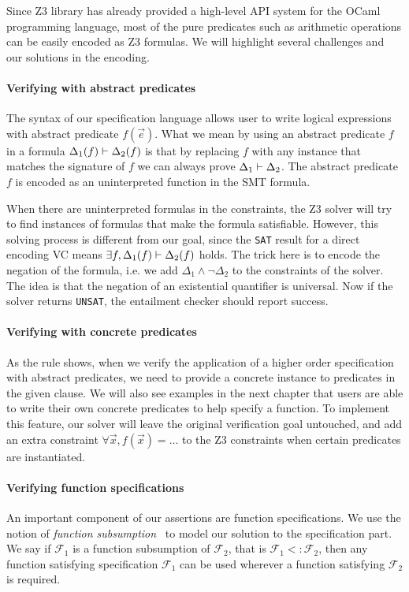Since Z3 library has already provided a high-level API system for the OCaml programming language, most of the pure predicates such as arithmetic operations can be easily encoded as Z3 formulas. We will highlight several challenges and our solutions in the encoding.

\paragraph{Verifying with abstract predicates} The syntax of our specification language allows user to write logical expressions with abstract predicate ${f(\vec{e})}$.
What we mean by using an abstract predicate $f$ in a formula $\Delta_1(f) \vdash \Delta_2(f)$ is that by replacing $f$ with any instance that matches the signature of $f$ we can always prove $\Delta_1 \vdash \Delta_2$. The abstract predicate $f$ is encoded as an uninterpreted function in the SMT formula. 

When there are uninterpreted formulas in the constraints, the Z3 solver will try to find instances of formulas that make the formula satisfiable. However, this solving process is different from our goal, since the \texttt{SAT} result for a direct encoding VC means $\exists f, \Delta_1(f) \vdash \Delta_2(f)$ holds.
The trick here is to encode the negation of the formula, i.e. we add $\Delta_1 \wedge \neg \Delta_2$ to the constraints of the solver. The idea is that the negation of an existential quantifier is universal. Now if the solver returns \texttt{UNSAT}, the entailment checker should report success.


\paragraph{Verifying with concrete predicates} As the rule  shows, when we verify the application of a higher order specification with abstract predicates, we need to provide a concrete instance to predicates in the given clause. We will also see examples in the next chapter that users are able to write their own concrete predicates to help specify a function. To implement this feature, our solver will leave the original verification goal untouched, and add an extra constraint $\forall \vec{x}, f(\vec{x}) = \ldots $ to the Z3 constraints when certain predicates are instantiated.

\paragraph{Verifying function specifications} An important component of our assertions are function specifications. We use the notion of \emph{function subsumption}~\cite{Andrew2021Subsumption} to model our solution to the specification part. We say if $\mathcal{F}_1$ is a function subsumption of $\mathcal{F}_2$, that is $\mathcal{F}_1 <: \mathcal{F}_2$, then any function satisfying specification $\mathcal{F}_1$ can be used wherever a function satisfying $\mathcal{F}_2$ is required.

